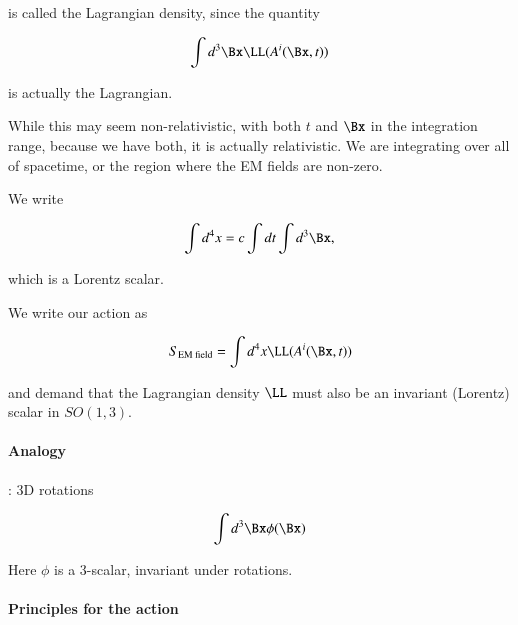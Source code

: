 is called the Lagrangian density, since the quantity

\begin{equation}\label{eqn:relativisticElectrodynamicsL12:130}
\int d^3\Bx \LL(A^i(\Bx, t))
\end{equation}

is actually the Lagrangian.

While this may seem non-relativistic, with both $t$ and $\Bx$ in the integration range, because we have both, it is actually relativistic.  We are integrating over all of spacetime, or the region where the EM fields are non-zero.

We write

\begin{equation}\label{eqn:relativisticElectrodynamicsL12:150}
\int d^4 x  = c \int dt \int d^3 \Bx,
\end{equation}

which is a Lorentz scalar.

We write our action as 

\begin{equation}\label{eqn:relativisticElectrodynamicsL12:170}
S_{\text{EM field}} = \int d^4 x \LL(A^i(\Bx, t))
\end{equation}

and demand that the Lagrangian density $\LL$ must also be an invariant (Lorentz) scalar in $SO(1,3)$.

\paragraph{Analogy}: 3D rotations

\begin{equation}\label{eqn:relativisticElectrodynamicsL12:190}
\int d^3 \Bx \phi(\Bx)
\end{equation}

Here $\phi$ is a 3-scalar, invariant under rotations.

\paragraph{Principles for the action}

